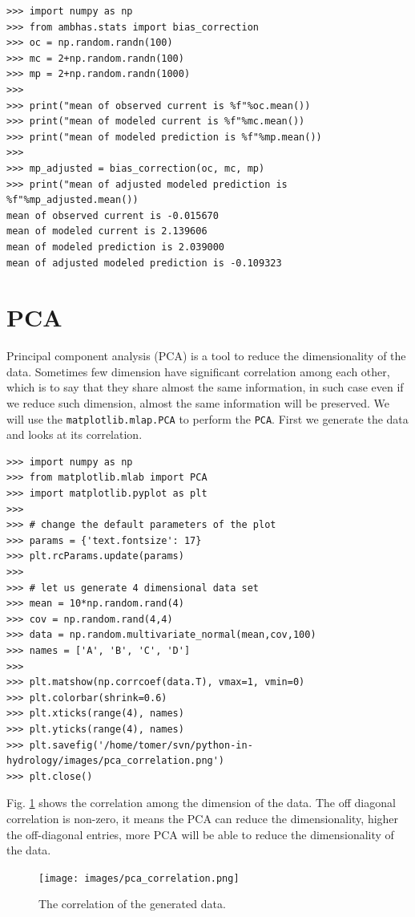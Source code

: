 \documentclass[10pt]{book}
\begin{document}
\beforeverb \begin{verbatim}
>>> import numpy as np
>>> from ambhas.stats import bias_correction
>>> oc = np.random.randn(100)
>>> mc = 2+np.random.randn(100)
>>> mp = 2+np.random.randn(1000)
>>> 
>>> print("mean of observed current is %f"%oc.mean())
>>> print("mean of modeled current is %f"%mc.mean())
>>> print("mean of modeled prediction is %f"%mp.mean())
>>> 
>>> mp_adjusted = bias_correction(oc, mc, mp)
>>> print("mean of adjusted modeled prediction is %f"%mp_adjusted.mean())
mean of observed current is -0.015670
mean of modeled current is 2.139606
mean of modeled prediction is 2.039000
mean of adjusted modeled prediction is -0.109323
\end{verbatim} \afterverb

\section{PCA}
Principal component analysis (PCA) is a tool to reduce the dimensionality of the data. Sometimes few dimension have significant correlation among each other, which is to say that they share almost the same information, in such case even if we reduce such dimension, almost the same information will be preserved. We will use the \verb"matplotlib.mlap.PCA" to perform the \verb"PCA". First we generate the data and looks at its correlation. 

\beforeverb \begin{verbatim}
>>> import numpy as np
>>> from matplotlib.mlab import PCA
>>> import matplotlib.pyplot as plt
>>> 
>>> # change the default parameters of the plot
>>> params = {'text.fontsize': 17}
>>> plt.rcParams.update(params)
>>> 
>>> # let us generate 4 dimensional data set
>>> mean = 10*np.random.rand(4)
>>> cov = np.random.rand(4,4)
>>> data = np.random.multivariate_normal(mean,cov,100)
>>> names = ['A', 'B', 'C', 'D']
>>> 
>>> plt.matshow(np.corrcoef(data.T), vmax=1, vmin=0)
>>> plt.colorbar(shrink=0.6)
>>> plt.xticks(range(4), names)
>>> plt.yticks(range(4), names)
>>> plt.savefig('/home/tomer/svn/python-in-hydrology/images/pca_correlation.png')
>>> plt.close()
\end{verbatim} \afterverb
Fig. \ref{fig:pca1} shows the correlation among the dimension of the data. The off diagonal correlation is non-zero, it means the PCA can reduce the dimensionality, higher the off-diagonal entries, more PCA will be able to reduce the dimensionality of the data. 

\beforefig
\begin{figure}[h!]
  \centering
    \texttt{[image: images/pca\_correlation.png]}
  \caption{The correlation of the generated data.}
   \label{fig:pca1}
\end{figure}
\afterfig
 
\end{document}

